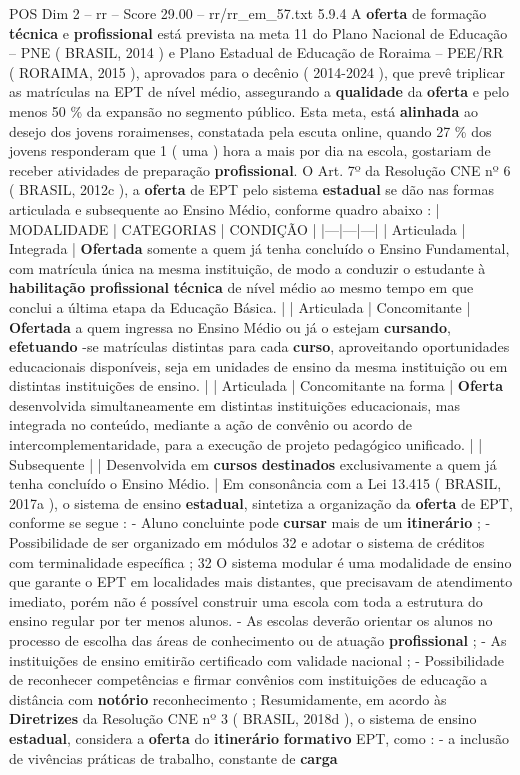 \begin{textsample}{POS Dim 2 – rr – Score 29.00 – rr/rr\_em\_57.txt}  \label{ex:f2_pos_108}
5.9.4 A \textbf{oferta} de formação \textbf{técnica} e \textbf{profissional} está prevista na meta 11 do Plano Nacional de Educação – PNE ( BRASIL, 2014 ) e Plano Estadual de Educação de Roraima – PEE/RR ( RORAIMA, 2015 ), aprovados para o decênio ( 2014-2024 ), que prevê triplicar as matrículas na EPT de nível médio, assegurando a \textbf{qualidade} da \textbf{oferta} e pelo menos 50 \% da expansão no segmento público.
Esta meta, está \textbf{alinhada} ao desejo dos jovens roraimenses, constatada pela escuta online, quando 27 \% dos jovens responderam que 1 ( uma ) hora a mais por dia na escola, gostariam de receber atividades de preparação \textbf{profissional}.
O Art. 7º da Resolução CNE nº 6 ( BRASIL, 2012c ), a \textbf{oferta} de EPT pelo sistema \textbf{estadual} se dão nas formas articulada e subsequente ao Ensino Médio, conforme quadro abaixo : | MODALIDADE | CATEGORIAS | CONDIÇÃO | |---|---|---| | Articulada | Integrada | \textbf{Ofertada} somente a quem já tenha concluído o Ensino Fundamental, com matrícula única na mesma instituição, de modo a conduzir o estudante à \textbf{habilitação} \textbf{profissional} \textbf{técnica} de nível médio ao mesmo tempo em que conclui a última etapa da Educação Básica. | | Articulada | Concomitante | \textbf{Ofertada} a quem ingressa no Ensino Médio ou já o estejam \textbf{cursando}, \textbf{efetuando} -se matrículas distintas para cada \textbf{curso}, aproveitando oportunidades educacionais disponíveis, seja em unidades de ensino da mesma instituição ou em distintas instituições de ensino. | | Articulada | Concomitante na forma | \textbf{Oferta} desenvolvida simultaneamente em distintas instituições educacionais, mas integrada no conteúdo, mediante a ação de convênio ou acordo de intercomplementaridade, para a execução de projeto pedagógico unificado. | | Subsequente | | Desenvolvida em \textbf{cursos} \textbf{destinados} exclusivamente a quem já tenha concluído o Ensino Médio. | Em consonância com a Lei 13.415 ( BRASIL, 2017a ), o sistema de ensino \textbf{estadual}, sintetiza a organização da \textbf{oferta} de EPT, conforme se segue : - Aluno concluinte pode \textbf{cursar} mais de um \textbf{itinerário} ; - Possibilidade de ser organizado em módulos 32 e adotar o sistema de créditos com terminalidade específica ; 32 O sistema modular é uma modalidade de ensino que garante o EPT em localidades mais distantes, que precisavam de atendimento imediato, porém não é possível construir uma escola com toda a estrutura do ensino regular por ter menos alunos. - As escolas deverão orientar os alunos no processo de escolha das áreas de conhecimento ou de atuação \textbf{profissional} ; - As instituições de ensino emitirão certificado com validade nacional ; - Possibilidade de reconhecer competências e firmar convênios com instituições de educação a distância com \textbf{notório} reconhecimento ; Resumidamente, em acordo às \textbf{Diretrizes} da Resolução CNE nº 3 ( BRASIL, 2018d ), o sistema de ensino \textbf{estadual}, considera a \textbf{oferta} do \textbf{itinerário} \textbf{formativo} EPT, como : - a inclusão de vivências práticas de trabalho, constante de \textbf{carga} 
\end{textsample}
